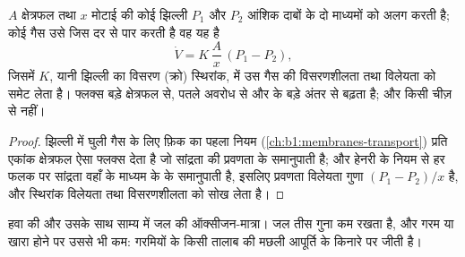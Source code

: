 \begin{theorem}[किसी विनिमय सतह के लिए फ़िक का नियम]\label{thm:b1:gas-exchange:fick}
$A$ क्षेत्रफल तथा $x$ मोटाई की कोई झिल्ली $P_1$ और $P_2$ आंशिक दाबों के
दो माध्यमों को अलग करती है; कोई गैस उसे जिस दर से पार करती है वह यह है
\[
\dot V = K\,\frac{A}{x}\,(P_1 - P_2),
\]
जिसमें $K$, यानी झिल्ली का विसरण (क्रो) स्थिरांक,  में उस गैस की
विसरणशीलता तथा विलेयता को समेट लेता है। फ्लक्स बड़े क्षेत्रफल से, पतले
अवरोध से और  के बड़े अंतर से बढ़ता है; और किसी चीज़ से नहीं।
\end{theorem}
\begin{proof}
झिल्ली में घुली गैस के लिए फ़िक का पहला नियम
(\cref{ch:b1:membranes-transport}) प्रति एकांक क्षेत्रफल ऐसा फ्लक्स देता
है जो सांद्रता की प्रवणता के समानुपाती है; और हेनरी के नियम से हर फलक पर
सांद्रता वहाँ के माध्यम के  के समानुपाती है, इसलिए प्रवणता
विलेयता गुणा $(P_1 - P_2)/x$ है, और स्थिरांक विलेयता तथा विसरणशीलता को
सोख लेता है।
\end{proof}

\begin{omfigure}

{\small हवा की और उसके साथ साम्य में जल की ऑक्सीजन-मात्रा।
जल तीस गुना कम रखता है, और गरम या खारा होने पर उससे भी कम: गरमियों के
किसी तालाब की मछली आपूर्ति के किनारे पर जीती है।}
\end{omfigure}

